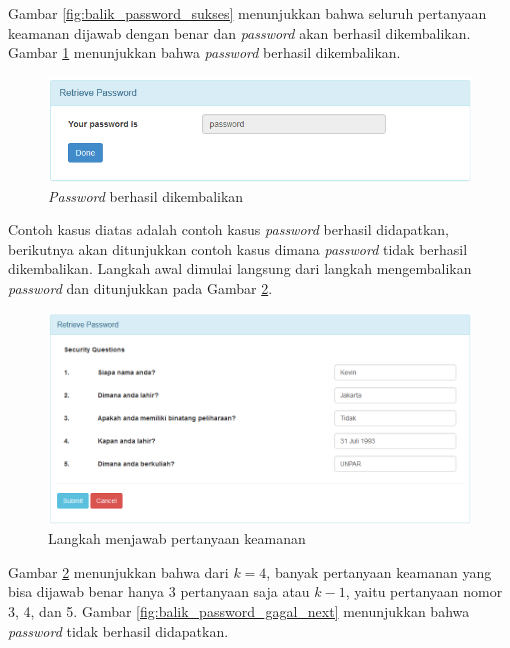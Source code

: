Gambar \ref{fig:balik_password_sukses} menunjukkan bahwa seluruh pertanyaan keamanan dijawab dengan benar dan \textit{password} akan berhasil dikembalikan. Gambar \ref{fig:balik_password_sukses_next} menunjukkan bahwa \textit{password} berhasil dikembalikan.

\begin{figure}[H]
	\includegraphics[scale=0.5]{Gambar/balik_password_sukses_next}
	\centering
	\caption{\textit{Password} berhasil dikembalikan}\label{fig:balik_password_sukses_next}
\end{figure}

Contoh kasus diatas adalah contoh kasus \textit{password} berhasil didapatkan, berikutnya akan ditunjukkan contoh kasus dimana \textit{password} tidak berhasil dikembalikan. Langkah awal dimulai langsung dari langkah mengembalikan \textit{password} dan ditunjukkan pada Gambar \ref{fig:balik_password_gagal}.

\begin{figure}[H]
	\includegraphics[scale=0.5]{Gambar/balik_password_gagal}
	\centering
	\caption{Langkah menjawab pertanyaan keamanan}\label{fig:balik_password_gagal}
\end{figure}

Gambar \ref{fig:balik_password_gagal} menunjukkan bahwa dari \begin{math}k=4\end{math}, banyak pertanyaan keamanan yang bisa dijawab benar hanya 3 pertanyaan saja atau \begin{math}k-1\end{math}, yaitu pertanyaan nomor 3, 4, dan 5. Gambar \ref{fig:balik_password_gagal_next} menunjukkan bahwa \textit{password} tidak berhasil didapatkan.

